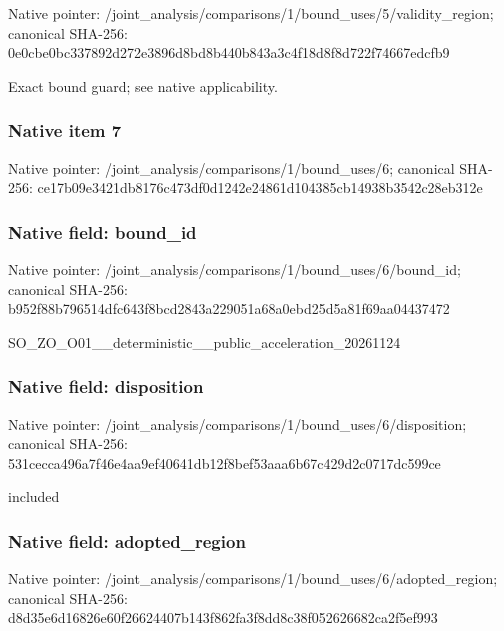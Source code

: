 \documentclass[10pt,a4paper]{article}
\begin{document}
Native pointer: /joint\_analysis/comparis\allowbreak{}ons/1/bound\_uses/5/valid\allowbreak{}ity\_region; canonical SHA-256: 0e0cbe0bc337892d272e3896\allowbreak{}d8bd8b440b843a3c4f18d8f8\allowbreak{}d722f74667edcfb9


Exact bound guard; see native applicability.


\subsubsection{Native item 7}


Native pointer: /joint\_analysis/comparis\allowbreak{}ons/1/bound\_uses/6; canonical SHA-256: ce17b09e3421db8176c473df\allowbreak{}0d1242e24861d104385cb149\allowbreak{}38b3542c28eb312e



\subsubsection{Native field: bound\_id}


Native pointer: /joint\_analysis/comparis\allowbreak{}ons/1/bound\_uses/6/bound\allowbreak{}\_id; canonical SHA-256: b952f88b796514dfc643f8bc\allowbreak{}d2843a229051a68a0ebd25d5\allowbreak{}a81f69aa04437472


SO\_ZO\_O01\_\_deterministic\allowbreak{}\_\_public\_acceleration\_20\allowbreak{}261124


\subsubsection{Native field: disposition}


Native pointer: /joint\_analysis/comparis\allowbreak{}ons/1/bound\_uses/6/dispo\allowbreak{}sition; canonical SHA-256: 531cecca496a7f46e4aa9ef4\allowbreak{}0641db12f8bef53aaa6b67c4\allowbreak{}29d2c0717dc599ce


included


\subsubsection{Native field: adopted\_region}


Native pointer: /joint\_analysis/comparis\allowbreak{}ons/1/bound\_uses/6/adopt\allowbreak{}ed\_region; canonical SHA-256: d8d35e6d16826e60f2662440\allowbreak{}7b143f862fa3f8dd8c38f052\allowbreak{}626682ca2f5ef993
\end{document}
